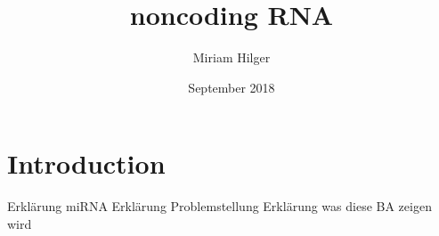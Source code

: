 \documentclass{article}
\title{noncoding RNA}
\author{Miriam Hilger }
\date{September 2018}
\begin{document}
\maketitle

\section{Introduction}
Erklärung miRNA \newline
Erklärung Problemstellung \newline
Erklärung was diese BA zeigen wird \newline

\section{}
\end{document}
